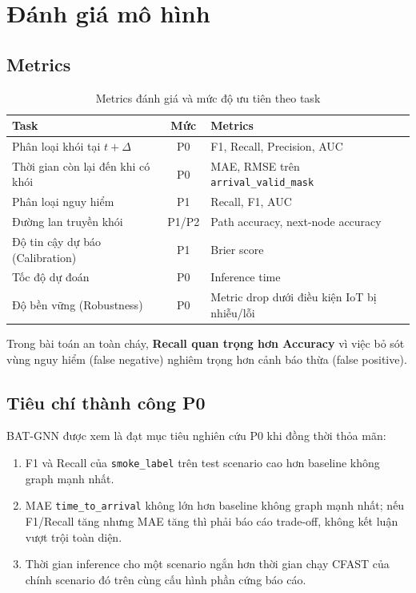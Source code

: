 \section{Đánh giá mô hình}
\label{sec:evaluation}

\subsection{Metrics}

\begin{table}[H]
\centering
\caption{Metrics đánh giá và mức độ ưu tiên theo task}
\label{tab:metrics}
\begin{tabularx}{\textwidth}{l c X}
\toprule
\textbf{Task} & \textbf{Mức} & \textbf{Metrics} \\
\midrule
Phân loại khói tại $t+\Delta$  & P0 & F1, Recall, Precision, AUC \\
Thời gian còn lại đến khi có khói & P0 & MAE, RMSE trên \texttt{arrival\_valid\_mask} \\
Phân loại nguy hiểm            & P1 & Recall, F1, AUC \\
Đường lan truyền khói          & P1/P2 & Path accuracy, next-node accuracy \\
Độ tin cậy dự báo (Calibration)& P1 & Brier score \\
Tốc độ dự đoán                 & P0 & Inference time \\
Độ bền vững (Robustness)       & P0 & Metric drop dưới điều kiện IoT bị nhiễu/lỗi \\
\bottomrule
\end{tabularx}
\end{table}

\begin{notebox}
Trong bài toán an toàn cháy, \textbf{Recall quan trọng hơn Accuracy} vì việc bỏ sót vùng nguy hiểm (false negative) nghiêm trọng hơn cảnh báo thừa (false positive).
\end{notebox}

\subsection{Tiêu chí thành công P0}

BAT-GNN được xem là đạt mục tiêu nghiên cứu P0 khi đồng thời thỏa mãn:
\begin{enumerate}
  \item F1 và Recall của \texttt{smoke\_label} trên test scenario cao hơn baseline không graph mạnh nhất.
  \item MAE \texttt{time\_to\_arrival} không lớn hơn baseline không graph mạnh nhất; nếu F1/Recall tăng nhưng MAE tăng thì phải báo cáo trade-off, không kết luận vượt trội toàn diện.
  \item Thời gian inference cho một scenario ngắn hơn thời gian chạy CFAST của chính scenario đó trên cùng cấu hình phần cứng báo cáo.
\end{enumerate}

